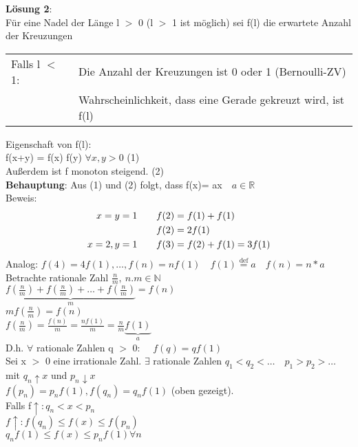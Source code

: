 \textbf{Lösung 2}:\\
Für eine Nadel der Länge l $>$ 0 (l $>$ 1 ist möglich) sei f(l) die erwartete Anzahl der Kreuzungen\smallskip\\
\begin{tabular}{ll}
Falls l $<$ 1:& Die Anzahl der Kreuzungen ist 0 oder 1 (Bernoulli-ZV)\\
& Wahrscheinlichkeit, dass eine Gerade gekreuzt wird, ist f(l)\\
\end{tabular}
Eigenschaft von f(l):\smallskip\\
f(x+y) = f(x)  f(y) $\forall x,y > 0$\hspace{1cm} (1)\smallskip\\
Außerdem ist f monoton steigend.\hspace{5.05cm} (2)\medskip\\
\textbf{Behauptung}: Aus (1) und (2) folgt, dass f(x)= ax$\quad a \in \mathds{R}$\medskip\\
Beweis:
\begin{align*}
x=y=1\qquad & f(2)=f(1)+f(1)\\
&f(2)=2f(1)\smallskip\\
x=2,y=1\qquad & f(3) = f(2)+f(1) = 3f(1)
\end{align*}
Analog: $f(4)=4f(1),\dots,f(n)=nf(1) \quad f(1) \overset{\text{def}}{=} a \quad f(n) = n*a$\medskip\\
Betrachte rationale Zahl $\frac{n}{m},\: n.m \in \mathds{N}$\smallskip\\
$\underbrace{f\left(\frac{n}{m}\right)+f\left(\frac{n}{m}\right)+\dots+f\left(\frac{n}{m}\right)}_m = f(n)$\medskip\\
$mf(\frac{n}{m}) = f(n)$\\
$f(\frac{n}{m})=\frac{f(n)}{m}=\frac{nf(1)}{m}=\frac{n}{m}\underbrace{f(1)}_a$\medskip\\
D.h. $\forall$ rationale Zahlen q $>$ 0: $\quad f(q) = qf(1)$\medskip\\
Sei x $>$ 0 eine irrationale Zahl.  $\exists$ rationale Zahlen $q_1<q_2<\dots \quad p_1 >p_2>\dots$ \\mit $q_n \uparrow x$ und $p_n \downarrow x$\medskip\\
$f(p_n) = p_nf(1), f(q_n)=q_nf(1)$ (oben gezeigt).
\medskip\\
Falls f$\uparrow: q_n < x < p_n$\smallskip\\
$f\uparrow: f(q_n)\leq f(x)\leq f(p_n)$\smallskip\\
$q_nf(1)\leq f(x) \leq p_nf(1) \forall n$\medskip\\
